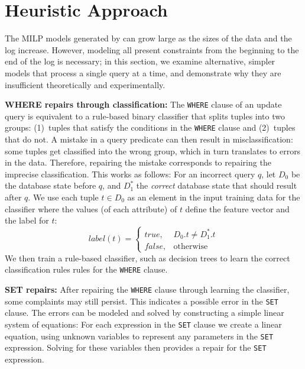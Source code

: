 
\appendix

\section{Heuristic Approach}
\label{sec:heuristic}
  
% 
The MILP models generated by \sys can grow large as the sizes of the
data and the log increase. However, modeling all present constraints
from the beginning to the end of the log is necessary; in this
section, we examine alternative, simpler models that process a single
query at a time, and demonstrate why they are insufficient 
theoretically and experimentally.

\smallskip
\noindent
\textbf{WHERE repairs through classification:}
The \texttt{WHERE} clause of an update query is equivalent to a
rule-based binary classifier that splits tuples into two groups:
(1)~tuples that satisfy the conditions in the \texttt{WHERE} clause
and (2)~tuples that do not. A mistake in a query predicate can then
result in misclassification: some tuples get classified into the wrong
group, which in turn translates to errors in the data. Therefore,
repairing the mistake corresponds to repairing the imprecise
classification. This works as follows: For an incorrect query $q$, let
$D_0$ be the database state before $q$, and $D_1^*$ the \emph{correct}
database state that should result after $q$.
We use each tuple $t \in D_0$ as an element in the input training data
for the classifier where the values (of each attribute) of $t$ define
the feature vector and the label for $t$:
	\[
    label(t)= 
    \begin{cases}
    true ,& D_0.t \neq D_1^*.t\\
    false,              & \text{otherwise}
    \end{cases}
\]
We then train a rule-based classifier, 
such as decision trees \cite{quinlan1987} to learn
the correct classification rules rules for the \texttt{WHERE} clause.


\smallskip
\noindent
\textbf{SET repairs:}
After repairing the \texttt{WHERE} clause through learning the classifier, 
some complaints may still persist. This
indicates a possible error in the \texttt{SET} clause. The errors can
be modeled and solved by constructing a simple linear system of
equations: For each expression in the \texttt{SET} clause we create a
linear equation, using unknown variables to represent any parameters
in the \texttt{SET} expression. Solving for these variables then
provides a repair for the \texttt{SET} expression.


